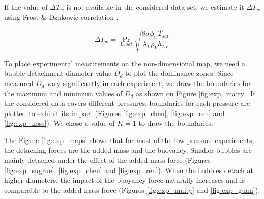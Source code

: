 If the value of $\Delta T_{w}$ is not available in the considered data-set, we estimate it $\Delta T_{w}$ using Frost \& Dzakowic correlation \cite{frost_extension_1967}.

\begin{equation}
\Delta T_{w} = \Pr_{L,sat} \sqrt{\frac{8 \sigma \phi_{w} T_{sat}}{\lambda_{L}\rho_{V}h_{LV}}}
\label{eq:frost}
\end{equation}


\npar 

To place experimental measurements on the non-dimensional map, we need a bubble detachment diameter value $D_{d}$ to plot the dominance zones. Since measured $D_{d}$ vary significantly in each experiment, we draw the boundaries for the maximum and minimum values of $D_{d}$ as shown on Figure \ref{fig:exp_maity}. If the considered data covers different pressures, boundaries for each pressure are plotted to exhibit its impact (Figures \ref{fig:exp_chen}, \ref{fig:exp_ren} and \ref{fig:exp_koss}). We chose a value of $K=1$ to draw the boundaries.

\npar

The Figure \ref{fig:exp_maps} shows that for most of the low pressure experiments, the detaching forces are the added mass and the buoyancy. Smaller bubbles are mainly detached under the effect of the added mass force (Figures \ref{fig:exp_sugrue}, \ref{fig:exp_chen} and \ref{fig:exp_ren}). When the bubbles detach at higher diameters, the impact of the buoyancy force naturally increases and is comparable to the added mass force (Figures \ref{fig:exp_maity} and \ref{fig:exp_guan}).


